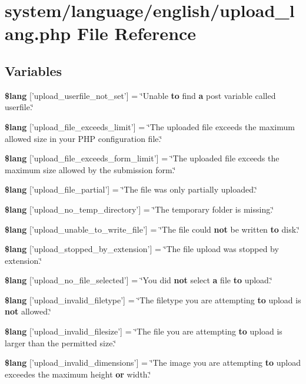 \section{system/language/english/upload\-\_\-lang.php File Reference}
\label{upload__lang_8php}
\subsection*{Variables}
\begin{DoxyCompactItemize}
\item 
{\bf \$lang} ['upload\-\_\-userfile\-\_\-not\-\_\-set'] = \char`\"{}Unable {\bf to} find {\bf a} post variable called userfile.\char`\"{}
\item 
{\bf \$lang} ['upload\-\_\-file\-\_\-exceeds\-\_\-limit'] = \char`\"{}The uploaded file exceeds the maximum allowed size in your P\-H\-P configuration file.\char`\"{}
\item 
{\bf \$lang} ['upload\-\_\-file\-\_\-exceeds\-\_\-form\-\_\-limit'] = \char`\"{}The uploaded file exceeds the maximum size allowed by the submission form.\char`\"{}
\item 
{\bf \$lang} ['upload\-\_\-file\-\_\-partial'] = \char`\"{}The file was only partially uploaded.\char`\"{}
\item 
{\bf \$lang} ['upload\-\_\-no\-\_\-temp\-\_\-directory'] = \char`\"{}The temporary folder is missing.\char`\"{}
\item 
{\bf \$lang} ['upload\-\_\-unable\-\_\-to\-\_\-write\-\_\-file'] = \char`\"{}The file could {\bf not} be written {\bf to} disk.\char`\"{}
\item 
{\bf \$lang} ['upload\-\_\-stopped\-\_\-by\-\_\-extension'] = \char`\"{}The file upload was stopped by extension.\char`\"{}
\item 
{\bf \$lang} ['upload\-\_\-no\-\_\-file\-\_\-selected'] = \char`\"{}You did {\bf not} select {\bf a} file {\bf to} upload.\char`\"{}
\item 
{\bf \$lang} ['upload\-\_\-invalid\-\_\-filetype'] = \char`\"{}The filetype you are attempting {\bf to} upload is {\bf not} allowed.\char`\"{}
\item 
{\bf \$lang} ['upload\-\_\-invalid\-\_\-filesize'] = \char`\"{}The file you are attempting {\bf to} upload is larger than the permitted size.\char`\"{}
\item 
{\bf \$lang} ['upload\-\_\-invalid\-\_\-dimensions'] = \char`\"{}The image you are attempting {\bf to} upload exceedes the maximum height {\bf or} width.\char`\"{}

\end{DoxyCompactItemize}
